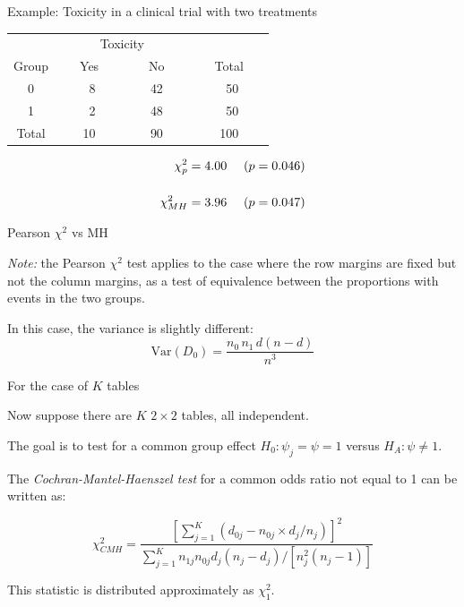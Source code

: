 \documentclass[ignorenonframetext,]{beamer}
\begin{document}
\begin{frame}{%
\protect\hypertarget{example-toxicity-in-a-clinical-trial-with-two-treatments}{%
Example: Toxicity in a clinical trial with two treatments}}

\begin{center}
\begin{tabular}{cccc}
\hline \hline
& \multicolumn{2}{c}{Toxicity}   \\ \cline{2-3}
\multicolumn{1}{c}{Group } & ~~~Yes~~~ & ~~~No~~~ & ~~~Total~~~ \\ \hline
0 &  ~8    & 42  &  ~50       \\
1 &  ~2   &  48 &   ~50        \\
\hline
Total & 10 & 90 &  100        \\ \hline \hline
\end{tabular}
\end{center}

\begin{align*}
\chi_p^2 &= 4.00 ~~~~ (p=0.046)\\[3ex]
\chi_{\tiny MH}^2 &= 3.96 ~~~~ (p=0.047)
\end{align*}

\end{frame}

\begin{frame}{%
\protect\hypertarget{pearson-chi2-vs-mh}{%
Pearson \(\chi^2\) vs MH}}

\emph{Note:} the Pearson \(\chi^2\) test applies to the case where the
row margins are fixed but not the column margins, as a test of
equivalence between the proportions with events in the two groups.

In this case, the variance is slightly different: \[
\text{Var}(D_0) = \frac{n_0 \, n_1 \, d(n-d)}{n^3}
\]

\end{frame}

\begin{frame}{%
\protect\hypertarget{for-the-case-of-k-tables}{%
For the case of \(K\) tables}}

Now suppose there are \(K\) \(2 \times 2\) tables, all independent.

The goal is to test for a common group effect \(H_0: \psi_j=\psi=1\)
versus \(H_A: \psi \neq 1\).

The \emph{Cochran-Mantel-Haenszel test} for a common odds ratio not
equal to 1 can be written as:

\[  
\chi^2_{CMH} =   \frac{\left[ {\sum_{j=1}^K (d_{0j} - n_{0j} \times d_j/n_j)}\right]^2}
        {\sum_{j=1}^K n_{1j} n_{0j} d_j (n_j-d_j)/[n_j^2(n_j-1)]}  \]

This statistic is distributed approximately as \(\chi^2_1\).

\end{frame}
\end{document}
